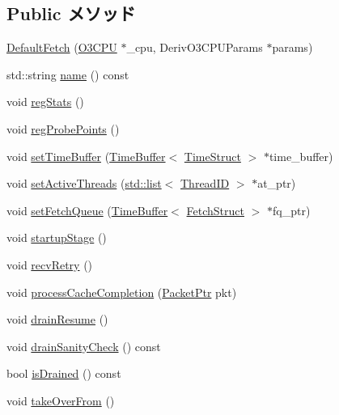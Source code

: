 \subsection*{Public メソッド}
\begin{DoxyCompactItemize}
\item 
\hyperlink{classDefaultFetch_a96cb569fd8ae5efebb8e7716f435d9d2}{DefaultFetch} (\hyperlink{classDefaultFetch_a44622cf06940413482836cb62931ac3f}{O3CPU} $\ast$\_\-cpu, DerivO3CPUParams $\ast$params)
\item 
std::string \hyperlink{classDefaultFetch_a37627d5d5bba7f4a8690c71c2ab3cb07}{name} () const 
\item 
void \hyperlink{classDefaultFetch_a4dc637449366fcdfc4e764cdf12d9b11}{regStats} ()
\item 
void \hyperlink{classDefaultFetch_aa2dab17a363fd4307274d579796adcf7}{regProbePoints} ()
\item 
void \hyperlink{classDefaultFetch_aa9fe72c29dff746fa7023a15c1134ada}{setTimeBuffer} (\hyperlink{classTimeBuffer}{TimeBuffer}$<$ \hyperlink{structTimeStruct}{TimeStruct} $>$ $\ast$time\_\-buffer)
\item 
void \hyperlink{classDefaultFetch_aab96bdacf8bd420402cbb543f994e054}{setActiveThreads} (\hyperlink{classstd_1_1list}{std::list}$<$ \hyperlink{base_2types_8hh_ab39b1a4f9dad884694c7a74ed69e6a6b}{ThreadID} $>$ $\ast$at\_\-ptr)
\item 
void \hyperlink{classDefaultFetch_ad1be90519aa7737ddf8e41de079a5ea9}{setFetchQueue} (\hyperlink{classTimeBuffer}{TimeBuffer}$<$ \hyperlink{classDefaultFetch_a3aac8607069f16898ef53cfaa2d97aeb}{FetchStruct} $>$ $\ast$fq\_\-ptr)
\item 
void \hyperlink{classDefaultFetch_a31d4cbdab16d4ff8d6bc7f84ece727da}{startupStage} ()
\item 
void \hyperlink{classDefaultFetch_a29cb5a4f98063ce6e9210eacbdb35298}{recvRetry} ()
\item 
void \hyperlink{classDefaultFetch_a3dc029c2e87eb911352b82ff15c86236}{processCacheCompletion} (\hyperlink{classPacket}{PacketPtr} pkt)
\item 
void \hyperlink{classDefaultFetch_a8f020d3237536fe007fc488c4125c5d8}{drainResume} ()
\item 
void \hyperlink{classDefaultFetch_a0240eb42fa57fe5d3788093f62b77347}{drainSanityCheck} () const 
\item 
bool \hyperlink{classDefaultFetch_adf5473c18a3d7c1e88c4a2072bce5526}{isDrained} () const 
\item 
void \hyperlink{classDefaultFetch_a8674059ce345e23aac5086b2c3e24a43}{takeOverFrom} ()

\end{DoxyCompactItemize}
